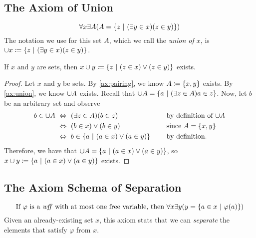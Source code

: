 \subsection{The Axiom of Union}
\begin{axiom}[Union]\label{ax:union}
    \[
        \forall x \exists A \pn*{A = \set*{z \suchthat \pn*{\exists y \in x}\pn*{z \in y}}}
    \]
    The notation we use for this set \(A\), which we call the \emph{union of \(x\)},
    is \(\union x \defn \set*{z \suchthat \pn*{\exists y \in x}\pn*{z \in y}}\).
\end{axiom}

\begin{theorem}\label{thm:union}
    If \(x\) and \(y\) are sets,
    then \(x \union y \defn \set*{z \suchthat \pn*{z \in x} \join \pn*{z \in y}}\) exists.
\end{theorem}
\begin{proof}
    Let \(x\) and \(y\) be sets.
    By \autoref{ax:pairing}, we know \(A \defn \set*{x, y}\) exists.
    By \autoref{ax:union}, we know \(\cup A\) exists.
    Recall that \(\union A = \set*{a \suchthat \pn*{\exists z \in A}{a \in z}}\).
    Now, let \(b\) be an arbitrary set and observe
    \begin{alignat*}{2}
        b \in \union A &\iff \pn*{\exists z \in A}\pn*{b \in z} &&\text{by definition of \(\union A\)} \\
                       &\iff (b \in x) \join (b \in y) &&\text{since \(A = \set*{x, y}\)} \\
                       &\iff b \in \set*{a \suchthat (a \in x) \join (a \in y)}~~~~&&\text{by definition}.
    \end{alignat*}
    Therefore, we have that \(\union A = \set*{a \suchthat (a \in x) \join (a \in y)}\),
    so \(x \union y \defn \set*{a \suchthat (a \in x) \join (a \in y)}\) exists.
\end{proof}

\subsection{The Axiom Schema of Separation}
\begin{axiom}[Separation]\label{ax:separation}
    \[
        \text{If \(\varphi\) is a {\wff} with at most one free variable, then }
        \forall x \exists y \pn*{y = \set*{a \in x \suchthat \varphi(a)}}
    \]
    Given an already-existing set \(x\),
    this axiom stats that we can \emph{separate} the elements that satisfy \(\varphi\) from \(x\).
\end{axiom}

